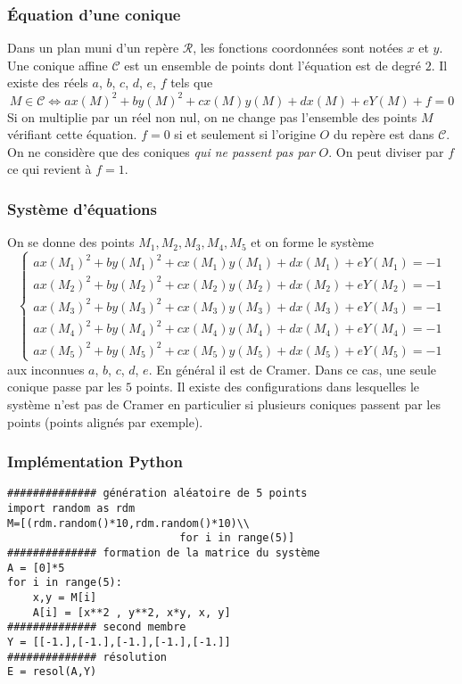 \begin{frame}
  \frametitle{\'Equation d'une conique}
Dans un plan muni d'un repère $\mathcal{R}$, les fonctions coordonnées sont notées $x$ et $y$.\newline
Une conique affine $\mathcal{C}$ est un ensemble de points dont l'équation est de degré $2$.\newline
Il existe des réels $a$, $b$, $c$, $d$, $e$, $f$ tels que 
\begin{displaymath}
  M\in \mathcal{C} \Leftrightarrow
  ax(M)^2 +by(M)^2 + cx(M)y(M) + dx(M) + eY(M) +f = 0
\end{displaymath}
Si on multiplie par un réel non nul, on ne change pas l'ensemble des points $M$ vérifiant cette équation.\newline
$f=0$ si et seulement si l'origine $O$ du repère est dans $\mathcal{C}$.\newline
On ne considère que des coniques \emph{qui ne passent pas par} $O$. On peut diviser par $f$ ce qui revient à $f=1$.
\end{frame}

\begin{frame}
  \frametitle{Système d'équations}
On se donne des points $M_1, M_2, M_3, M_4, M_5$ et on forme le système
\begin{displaymath}
\left\lbrace
\begin{aligned}
  ax(M_1)^2 +by(M_1)^2 + cx(M_1)y(M_1) + dx(M_1) + eY(M_1) = -1 \\
  ax(M_2)^2 +by(M_2)^2 + cx(M_2)y(M_2) + dx(M_2) + eY(M_2) = -1 \\
  ax(M_3)^2 +by(M_3)^2 + cx(M_3)y(M_3) + dx(M_3) + eY(M_3) = -1 \\
  ax(M_4)^2 +by(M_4)^2 + cx(M_4)y(M_4) + dx(M_4) + eY(M_4) = -1 \\
  ax(M_5)^2 +by(M_5)^2 + cx(M_5)y(M_5) + dx(M_5) + eY(M_5) = -1  
\end{aligned}
\right. 
\end{displaymath}
 aux inconnues $a$, $b$, $c$, $d$, $e$.\newline
En général il est de Cramer. Dans ce cas, une seule conique passe par les $5$ points.\newline
Il existe des configurations dans lesquelles le système n'est pas de Cramer en particulier si plusieurs coniques passent par les points (points alignés par exemple).
\end{frame}

\begin{frame}[fragile]
  \frametitle{Implémentation Python}
\begin{verbatim}
############## génération aléatoire de 5 points
import random as rdm
M=[(rdm.random()*10,rdm.random()*10)\\
                           for i in range(5)]
############## formation de la matrice du système
A = [0]*5
for i in range(5):
    x,y = M[i]
    A[i] = [x**2 , y**2, x*y, x, y]
############## second membre
Y = [[-1.],[-1.],[-1.],[-1.],[-1.]]
############## résolution
E = resol(A,Y)
\end{verbatim}
\end{frame}

